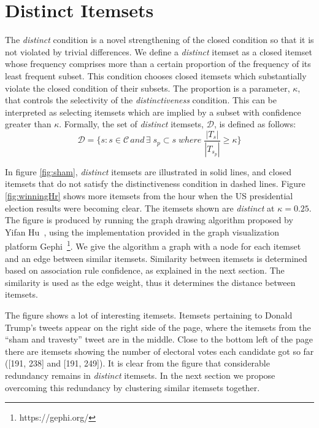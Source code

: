 \documentclass[letterpaper,12pt,titlepage,oneside,final]{book}
\begin{document}
\section{Distinct Itemsets}


The \emph{distinct} condition is a novel strengthening of the closed condition
so that it is not violated by trivial differences.
We define a \emph{distinct} itemset as a closed itemset whose frequency
comprises more than a certain proportion of the frequency of its least
frequent subset. 
This condition chooses closed itemsets which substantially violate the closed
condition of their subsets.
The proportion is a parameter, $\kappa$, that controls the selectivity of the
\emph{distinctiveness} condition.
This can be interpreted as selecting itemsets which are implied by a subset
with confidence greater than $\kappa$.
Formally, the set of \emph{distinct} itemsets, $\mathcal{D}$,
is defined as follows:
\begin{equation}\mathcal{D} = \{s: s \in \mathcal{C} \, and \, \exists \; s_{p} \subset s \; where \; \frac{|T_{s}|}{|T_{s_{p}}|} \ge \kappa 
\}\end{equation}

In figure \ref{fig:sham}, \emph{distinct} itemsets are illustrated in solid
lines, and closed itemsets that do not satisfy the distinctiveness condition in dashed lines.
Figure \ref{fig:winningHr} shows more itemsets from the hour when 
the US presidential election results were becoming clear.
The itemsets shown are \emph{distinct} at $\kappa = 0.25$.
The figure is produced by running the graph drawing algorithm proposed by Yifan Hu~\cite{hu2005efficient},
using the implementation provided 
in the graph visualization platform Gephi~\footnote{https://gephi.org/}.
We give the algorithm a graph with a node for each itemset and 
an edge between similar itemsets.
Similarity between itemsets
is determined based on 
association rule confidence,
as explained in the next section.
The similarity is used as the edge weight,
thus it determines the distance between itemsets.

The figure shows a lot of interesting itemsets.
Itemsets pertaining to Donald Trump's tweets appear on the right side of the page,
where the itemsets from the ``sham and travesty'' tweet are in the middle.
Close to the bottom left of the page there are itemsets showing the number
of electoral votes each candidate got so far ([191, 238] and [191, 249]). 
It is clear from the figure that considerable redundancy remains in
\emph{distinct} itemsets. 
In the next section we propose overcoming this redundancy 
by clustering similar itemsets together.
\end{document}
